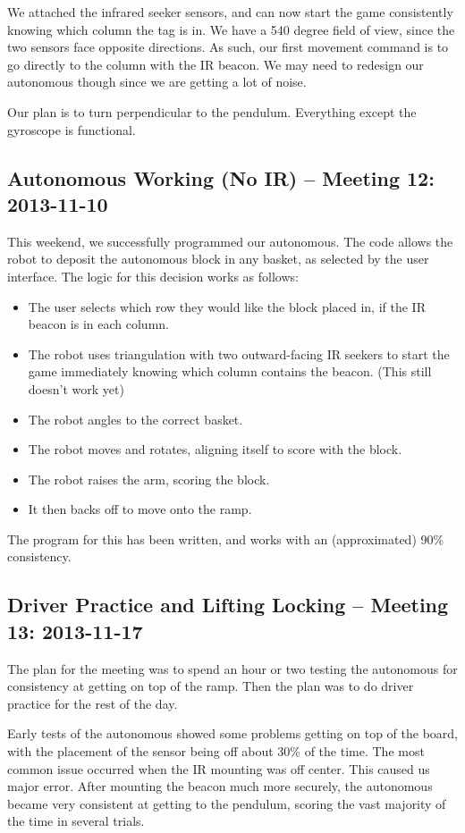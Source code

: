 We attached the infrared seeker sensors, and can now start the game consistently knowing which column the tag is in. We have a 540 degree field of view, since the two sensors face opposite directions. As such, our first movement command is to go directly to the column with the IR beacon. We may need to redesign our autonomous though since we are getting a lot of noise. 

Our plan is to turn perpendicular to the pendulum. Everything except the gyroscope is functional.

\newpage \subsection{Autonomous Working (No IR) -- Meeting 12: 2013-11-10}
This weekend, we successfully programmed our autonomous. The code allows the robot to deposit the autonomous block in any basket, as selected by the user interface. The logic for this decision works as follows:
\begin{itemize}
\item The user selects which row they would like the block placed in, if the IR beacon is in each column.
\item The robot uses triangulation with two outward-facing IR seekers to start the game immediately knowing which column contains the beacon. (This still doesn't work yet)
\item The robot angles to the correct basket.
\item The robot moves and rotates, aligning itself to score with the block.
\item The robot raises the arm, scoring the block.
\item It then backs off to move onto the ramp.
\end{itemize}

The program for this has been written, and works with an (approximated) 90\% consistency.

\newpage \subsection{Driver Practice and Lifting Locking -- Meeting 13: 2013-11-17}
The plan for the meeting was to spend an hour or two testing the autonomous for consistency at getting on top of the ramp. Then the plan was to do driver practice for the rest of the day.

Early tests of the autonomous showed some problems getting on top of the board, with the placement of the sensor being off about 30\% of the time. The most common issue occurred when the IR mounting was off center. This caused us major error. After mounting the beacon much more securely, the autonomous became very consistent at getting to the pendulum, scoring the vast majority of the time in several trials.

